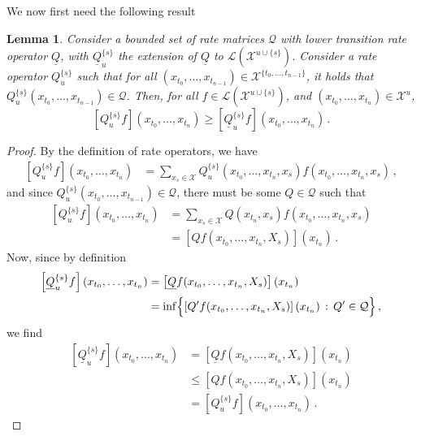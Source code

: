 \documentclass[a4paper,reqno]{amsart}
\newtheorem{lemma}[theorem]{Lemma}
\newcommand{\states}{\mathcal{X}}
\newcommand{\gambles}{\mathcal{L}}
\newcommand{\lrate}{\underline{Q}}
\begin{document}
We now first need the following result
\begin{lemma}
Consider a bounded set of rate matrices $\mathcal{Q}$ with lower transition rate operator $\lrate$, with $\lrate_u^{\{s\}}$ the extension of $\lrate$ to $\gambles(\states^{u\cup\{s\}})$. Consider a rate operator $Q_u^{\{s\}}$ such that for all $(x_{t_0},\ldots,x_{t_{n-1}})\in\states^{\{t_0,\ldots,t_{n-1}\}}$, it holds that $Q_u^{\{s\}}(x_{t_0},\ldots,x_{t_{n-1}})\in\mathcal{Q}$. Then, for all $f\in\gambles(\states^{u\cup\{s\}})$, and $(x_{t_0},\ldots,x_{t_n})\in\states^u$,
\begin{equation*}
\left[Q_u^{\{s\}}f\right](x_{t_0},\ldots,x_{t_n}) \geq \left[\lrate_u^{\{s\}}f\right](x_{t_0},\ldots,x_{t_n})\,.
\end{equation*}
\end{lemma}
\begin{proof}
By the definition of rate operators, we have
\begin{align*}
\left[Q_u^{\{s\}}f\right](x_{t_0},\ldots,x_{t_n}) &= \sum_{x_s\in\states} Q_u^{\{s\}}(x_{t_0},\ldots,x_{t_n}, x_s) f(x_{t_0},\ldots,x_{t_n}, x_s)\,,
\end{align*}
and since $Q_u^{\{s\}}(x_{t_0},\ldots,x_{t_{n-1}})\in\mathcal{Q}$, there must be some $Q\in\mathcal{Q}$ such that
\begin{align*}
\left[Q_u^{\{s\}}f\right](x_{t_0},\ldots,x_{t_n}) &= \sum_{x_s\in\states} Q(x_{t_n}, x_s) f(x_{t_0},\ldots,x_{t_n}, x_s) \\
 &= \left[Q f(x_{t_0},\ldots,x_{t_n},X_s)\right](x_{t_n})\,.
\end{align*}
Now, since by definition
\begin{align*}
\left[\lrate_u^{\{s\}}f\right](x_{t_0},\ldots,x_{t_n}) &= \left[\lrate f(x_{t_0},\ldots,x_{t_{n}},X_s)\right](x_{t_n}) \\
 &= \inf\Bigl\{\left[Q' f(x_{t_0},\ldots,x_{t_{n}},X_s)\right](x_{t_n})\,:\,Q'\in\mathcal{Q}\Bigr\}\,,
\end{align*}
we find
\begin{align*}
\left[\lrate_u^{\{s\}}f\right](x_{t_0},\ldots,x_{t_n}) &= \left[\lrate f(x_{t_0},\ldots,x_{t_{n}},X_s)\right](x_{t_n}) \\
 &\leq \left[Q f(x_{t_0},\ldots,x_{t_n},X_s)\right](x_{t_n}) \\
 &= \left[Q_u^{\{s\}}f\right](x_{t_0},\ldots,x_{t_n})\,.
\end{align*}
\end{proof}
\end{document}
